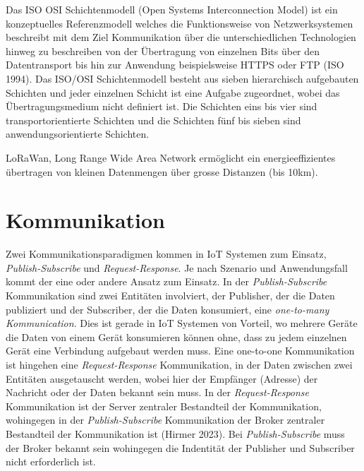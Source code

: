 \documentclass[
  11pt,
  a4paper,
  oneside, openany  ,captions=tableheading
]{scrbook}
\providecommand{\tightlist}{%
  \setlength{\itemsep}{0pt}\setlength{\parskip}{0pt}}
\theoremstyle{remark}
\begin{document}
\begin{description}
\tightlist
\item[ISO OSI Schichtenmodell\index{ISO/OSI Schichtenmodell}]
Das ISO OSI Schichtenmodell (Open Systems Interconnection Model) ist ein
konzeptuelles Referenzmodell welches die Funktionsweise von
Netzwerksystemen beschreibt mit dem Ziel Kommunikation über die
unterschiedlichen Technologien hinweg zu beschreiben von der Übertragung
von einzelnen Bits über den Datentransport bis hin zur Anwendung
beispielsweise HTTPS oder FTP (ISO 1994). Das ISO/OSI Schichtenmodell
besteht aus sieben hierarchisch aufgebauten Schichten und jeder
einzelnen Schicht ist eine Aufgabe zugeordnet, wobei das
Übertragungsmedium nicht definiert ist. Die Schichten eins bis vier sind
transportorientierte Schichten und die Schichten fünf bis sieben sind
anwendungsorientierte Schichten.
\item[Long Range Wide Area Network (LoRaWAN) oder LoRa\index{LoRaWAN}]
LoRaWan, Long Range Wide Area Network ermöglicht ein energieeffizientes
übertragen von kleinen Datenmengen über grosse Distanzen (bis 10km).
\end{description}

\section{Kommunikation}\label{kommunikation}

Zwei Kommunikationsparadigmen kommen in IoT Systemen zum Einsatz,
\emph{Publish-Subscribe} und \emph{Request-Response}. Je nach Szenario
und Anwendungsfall kommt der eine oder andere Ansatz zum Einsatz. In der
\emph{Publish-Subscribe} Kommunikation sind zwei Entitäten involviert,
der Publisher, der die Daten publiziert und der Subscriber, der die
Daten konsumiert, eine \emph{one-to-many Kommunication}. Dies ist gerade
in IoT Systemen von Vorteil, wo mehrere Geräte die Daten von einem Gerät
konsumieren können ohne, dass zu jedem einzelnen Gerät eine Verbindung
aufgebaut werden muss. Eine one-to-one Kommunikation ist hingehen eine
\emph{Request-Response} Kommunikation, in der Daten zwischen zwei
Entitäten ausgetauscht werden, wobei hier der Empfänger (Adresse) der
Nachricht oder der Daten bekannt sein muss. In der
\emph{Request-Response} Kommunikation ist der Server zentraler
Bestandteil der Kommunikation, wohingegen in der
\emph{Publish-Subscribe} Kommunikation der Broker zentraler Bestandteil
der Kommunikation ist (Hirmer 2023). Bei \emph{Publish-Subscribe} muss
der Broker bekannt sein wohingegen die Indentität der Publisher und
Subscriber nicht erforderlich ist.
\end{document}
